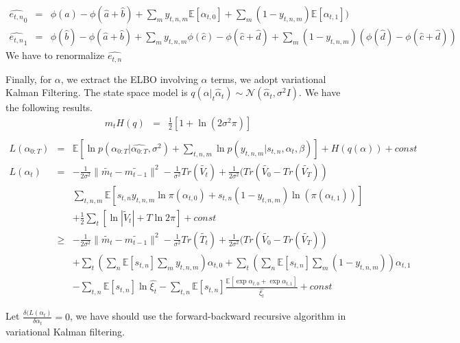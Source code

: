 \documentclass[11pt]{report}
\newcommand{\Ep}{\mathbb{E}}
\newcommand{\Gaussian}{\mathcal{N}}
\begin{document}
\begin{eqnarray}
\hat{e_{t,n}}_0 & = &\phi(\hat{a})-\phi(\hat{a}+\hat{b}) + \sum_{m}  y_{t,n,m}   \Ep[\alpha_{t,0}] +\sum_m (1-y_{t,n,m}) \Ep[\alpha_{t,1}])   \\\nonumber
\hat{e_{t,n}}_1 & = &\phi(\hat{b})-\phi(\hat{a}+\hat{b}) + \sum_{m}  y_{t,n,m} \phi(\hat{c})-\phi(\hat{c}+\hat{d}) +\sum_m (1-y_{t,n,m}) (\phi(\hat{d})-\phi(\hat{c}+\hat{d})) 
\end{eqnarray}
We have to renormalize $\hat{e_{t,n}}$

Finally, for $\alpha$, we extract the ELBO involving $\alpha$ terms, we adopt variational Kalman Filtering. The state space model is $q(\alpha|_t\hat{\alpha}_{t})\sim \Gaussian(\hat{\alpha}_t,\sigma^2I)$. We have the following results.
\begin{eqnarray*}
m_t
H(q) &= & \frac{1}{2} [1+\ln (2\sigma^2 \pi)] \\\nonumber

\end{eqnarray*}
\begin{eqnarray*}
L(\alpha_{0:T}) & = & \Ep[\ln p(\alpha_{0:T}|\hat{\alpha_{0:T}},\sigma^2) + \sum_{t,n,m}  \ln p(y_{t,n,m}|s_{t,n},\alpha_t,\beta) ] + H(q(\alpha)) + const \\\nonumber
L(\alpha_t) & = & -\frac{1}{2\sigma^2} \|\tilde{m_t}-\tilde{m_{t-1}}\|^2 - \frac{1}{\sigma^2} Tr(\tilde {V_t}) + \frac{1}{2\sigma^2} (Tr(\tilde{V_0} - Tr(\tilde{V_T})) \\\nonumber
& & \sum_{t,n,m} \Ep [s_{t,n} y_{t,n,m} \ln \pi(\alpha_{t,0}) + s_{t,n}(1-y_{t,n,m}) \ln (\pi(\alpha_{t,1}))]  \\\nonumber
& & + \frac{1}{2} \sum_t [\ln |\tilde{V}_t| + T\ln 2\pi] + const \\\nonumber
& \geq & -\frac{1}{2\sigma^2} \|\tilde{m_t}-\tilde{m_{t-1}}\|^2 - \frac{1}{\sigma^2} Tr(\tilde {T_t}) + \frac{1}{2\sigma^2} (Tr(\tilde{V_0} - Tr(\tilde{V_T})) \\\nonumber
& & + \sum_t(\sum_n \Ep[s_{t,n}] \sum_m y_{t,n,m}) \alpha_{t,0} + \sum_t(\sum_n \Ep[s_{t,n}] \sum_m (1-y_{t,n,m})) \alpha_{t,1}\\\nonumber
& & - \sum_{t,n} \Ep[s_{t,n}] \ln \hat{\xi_t}  -  \sum_{t,n} \Ep[s_{t,n}] \frac{\Ep[\exp \alpha_{t,0} + \exp \alpha_{t,1} ]}{\hat{\xi_t}}  + const
\end{eqnarray*}

Let $\frac{\delta(L(\alpha_t)}{\delta \alpha_t}=0$, we have should use the forward-backward recursive algorithm in variational Kalman filtering. 
\end{document}

